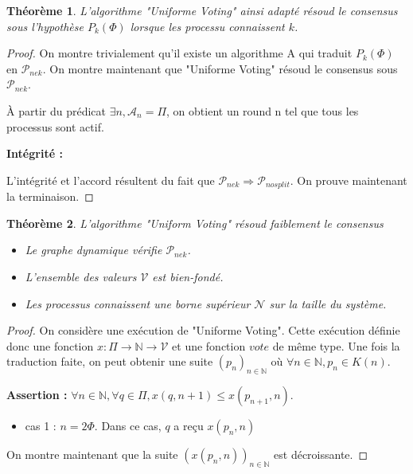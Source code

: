\documentclass{article}
\newtheorem{theorem}{Théorème}
\begin{document}
\begin{theorem}
	L'algorithme "Uniforme Voting" ainsi adapté résoud le consensus sous l'hypothèse $P_k(\Phi)$ lorsque les processu connaissent $k$.
\end{theorem}
\begin{proof}
	On montre trivialement qu'il existe un algorithme A qui traduit $P_k(\Phi)$ en $\mathcal{P}_{nek}$. On montre maintenant que "Uniforme Voting" résoud le consensus sous $\mathcal{P}_{nek}$.

	À partir du prédicat $\exists n, \mathcal{A}_n = \Pi$, on obtient un round n tel que tous les processus sont actif.

	\textbf{Intégrité :}

	L'intégrité et l'accord résultent du fait que $\mathcal{P}_{nek} \Rightarrow \mathcal{P}_{nosplit}$. On prouve maintenant la terminaison.
\end{proof}

\begin{theorem}

	L'algorithme "Uniform Voting" résoud faiblement le consensus 

	\begin{itemize}

	\item Le graphe dynamique vérifie $\mathcal{P}_{nek}$.
	\item L'ensemble des valeurs $\mathcal{V}$ est bien-fondé.
	\item Les processus connaissent une borne supérieur $\mathcal{N}$ sur la taille du système.

	\end{itemize}
\end{theorem}

\begin{proof}

	On considère une exécution de "Uniforme Voting". Cette exécution définie donc
	une fonction $x : \Pi \rightarrow \mathds{N} \rightarrow \mathcal{V}$ et une fonction $vote$ de même type.
	Une fois la traduction faite, on peut obtenir une suite $(p_n)_{n \in \mathds{N}}$ où $\forall n \in \mathds{N}, p_n \in K(n)$.

	\textbf{Assertion :} $\forall n \in \mathds{N}, \forall q \in \Pi, x(q,n+1) \leq x(p_{n+1},n)$.
	\begin{itemize}

	\item cas 1 : $n = 2 \Phi$. Dans ce cas, $q$ a reçu $x(p_n,n)$ 

	\end{itemize}

	On montre maintenant que la suite $(x(p_n, n))_{n \in \mathds{N}}$ est décroissante.
\end{proof}
\end{document}
